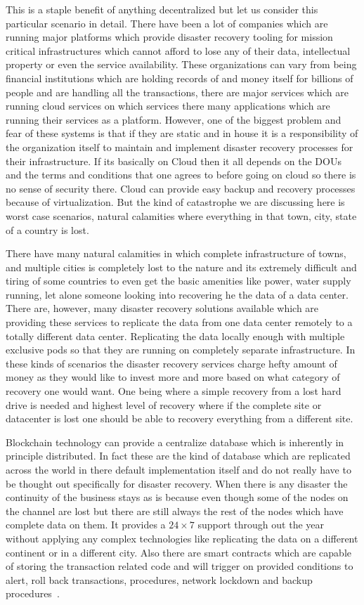This is a staple benefit of anything decentralized but let us consider
this particular scenario in detail. There have been a lot of companies
which are running major platforms which provide disaster recovery
tooling for mission critical infrastructures which cannot afford to
lose any of their data, intellectual property or even the service
availability. These organizations can vary from being financial
institutions which are holding records of and money itself for
billions of people and are handling all the transactions, there are
major services which are running cloud services on which services
there many applications which are running their services as a
platform. However, one of the biggest problem and fear of these
systems is that if they are static and in house it is a responsibility
of the organization itself to maintain and implement disaster recovery
processes for their infrastructure. If its basically on Cloud then it
all depends on the DOUs and the terms and conditions that one agrees
to before going on cloud so there is no sense of security there. Cloud
can provide easy backup and recovery processes because of
virtualization. But the kind of catastrophe we are discussing here is
worst case scenarios, natural calamities where everything in that
town, city, state of a country is lost.

There have many natural calamities in which complete infrastructure of
towns, and multiple cities is completely lost to the nature and its
extremely difficult and tiring of some countries to even get the basic
amenities like power, water supply running, let alone someone
looking into recovering he the data of a data center. There are,
however, many disaster recovery solutions available which are
providing these services to replicate the data from one data center
remotely to a totally different data center. Replicating the data
locally enough with multiple exclusive pods so that they are running
on completely separate infrastructure. In these kinds of scenarios the
disaster recovery services charge hefty amount of money as they would like
to invest more and more based on what category of recovery one would
want. One being where a simple recovery from a lost hard drive is
needed and highest level of recovery where if the complete site or
datacenter is lost one should be able to recovery everything from a
different site.

Blockchain technology can provide a centralize database which is
inherently in principle distributed. In fact these are the kind of
database which are replicated across the world in there default
implementation itself and do not really have to be thought out
specifically for disaster recovery. When there is any disaster the
continuity of the business stays as is because even though some of the
nodes on the channel are lost but there are still always the rest of
the nodes which have complete data on them. It provides a
$24 \times 7$ support through out the year without applying any
complex technologies like replicating the data on a different
continent or in a different city. Also there are smart contracts which
are capable of storing the transaction related code and will trigger
on provided conditions to alert, roll back transactions, procedures,
network lockdown and backup procedures~\cite{elmer7}.

